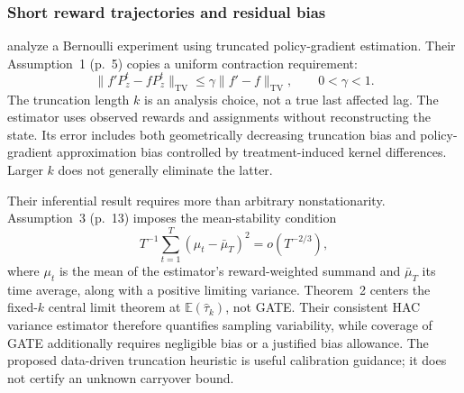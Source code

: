 \subsubsection{Short reward trajectories and residual bias}

\citet{johari2025} analyze a Bernoulli experiment using truncated policy-gradient estimation. Their Assumption~1 (p.~5) copies a uniform contraction requirement:
\begin{equation}
 \lVert f'P_z^t-fP_z^t\rVert_{\mathrm{TV}}
 \leq\gamma\lVert f'-f\rVert_{\mathrm{TV}},\qquad0<\gamma<1.
\end{equation}
The truncation length $k$ is an analysis choice, not a true last affected lag. The estimator uses observed rewards and assignments without reconstructing the state. Its error includes both geometrically decreasing truncation bias and policy-gradient approximation bias controlled by treatment-induced kernel differences. Larger $k$ does not generally eliminate the latter.

Their inferential result requires more than arbitrary nonstationarity. Assumption~3 (p.~13) imposes the mean-stability condition
\begin{equation}
 T^{-1}\sum_{t=1}^{T}(\mu_t-\bar\mu_T)^2=o(T^{-2/3}),
\end{equation}
where $\mu_t$ is the mean of the estimator's reward-weighted summand and $\bar\mu_T$ its time average, along with a positive limiting variance. Theorem~2 centers the fixed-$k$ central limit theorem at $\mathbb{E}(\widehat\tau_k)$, not GATE. Their consistent HAC variance estimator therefore quantifies sampling variability, while coverage of GATE additionally requires negligible bias or a justified bias allowance. The proposed data-driven truncation heuristic is useful calibration guidance; it does not certify an unknown carryover bound.
